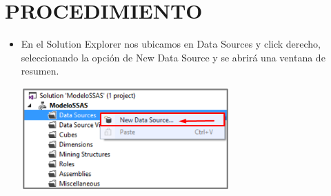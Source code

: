 \section{PROCEDIMIENTO} 

\begin{itemize}
\subsection{Creación de un Data Source}
	 \item En el Solution Explorer nos ubicamos en Data Sources y click derecho, seleccionando la opción de New
Data Source y se abrirá una ventana de resumen.
	\begin{center}
	\includegraphics[width=8cm]{./Imagenes/img2}
	\end{center}


\end{itemize}
